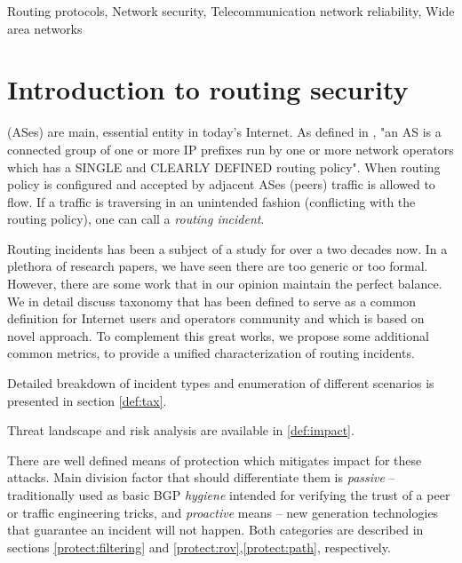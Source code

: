 \documentclass[journal,a4paper,twoside]{IEEEtran}
\begin{document}

\begin{IEEEkeywords}
Routing protocols, Network security, Telecommunication network reliability, Wide area networks
\end{IEEEkeywords}

\IEEEpeerreviewmaketitle


\section{Introduction to routing security}


 (ASes) are main, essential entity in today's Internet. As defined in \cite{rfc1930}, "an AS is a connected group of one or more IP prefixes run by one or more network operators which has a SINGLE and CLEARLY DEFINED routing policy". When routing policy is configured and accepted by adjacent ASes (peers) traffic is allowed to flow. If a traffic is traversing in an unintended fashion (conflicting with the routing policy), one can call a \emph{routing incident}.

Routing incidents has been a subject of a study for over a two decades now. In a plethora of research papers, we have seen \cite{Chakrabarti2002} there are too generic or \cite{Schlamp2016} too formal. However, there are some work that in our opinion maintain the perfect balance. We in detail discuss \cite{rfc7908} taxonomy that has been defined to serve as a common definition for Internet users and operators community and \cite{Sermpezis2018a} which is based on novel approach. To complement this great works, we propose some additional common metrics, to provide a unified characterization of routing incidents.

Detailed breakdown of incident types and enumeration of different scenarios is presented in section \ref{def:tax}.

Threat landscape and risk analysis are available in \ref{def:impact}.

There are well defined means of protection which mitigates impact for these attacks. Main division factor that should differentiate them is \emph{passive} -- traditionally used as basic BGP \emph{hygiene} intended for verifying the trust of a peer or traffic engineering tricks, and \emph{proactive} means -- new generation technologies that guarantee an incident will not happen. Both categories are described in sections \ref{protect:filtering} and \ref{protect:rov},\ref{protect:path}, respectively.
\end{document}
